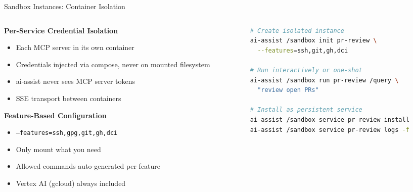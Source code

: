 \documentclass[aspectratio=169,10pt]{beamer}
\begin{document}
\begin{frame}[fragile]{Sandbox Instances: Container Isolation}
\begin{columns}[T]
\begin{column}{0.48\textwidth}
\textbf{\color{rhred}Per-Service Credential Isolation}
\begin{itemize}\scriptsize
  \item Each MCP server in its own container
  \item Credentials injected via compose, never on mounted filesystem
  \item ai-assist never sees MCP server tokens
  \item SSE transport between containers
\end{itemize}

\medskip
\textbf{\color{rhred}Feature-Based Configuration}
\begin{itemize}\scriptsize
  \item \texttt{--features=ssh,gpg,git,gh,dci}
  \item Only mount what you need
  \item Allowed commands auto-generated per feature
  \item Vertex AI (gcloud) always included
\end{itemize}
\end{column}
\begin{column}{0.48\textwidth}
\begin{lstlisting}[basicstyle=\ttfamily\fontsize{5}{6}\selectfont,frame=single,language=bash]
# Create isolated instance
ai-assist /sandbox init pr-review \
  --features=ssh,git,gh,dci

# Run interactively or one-shot
ai-assist /sandbox run pr-review /query \
  "review open PRs"

# Install as persistent service
ai-assist /sandbox service pr-review install
ai-assist /sandbox service pr-review logs -f
\end{lstlisting}

\smallskip
\centering
{}
\end{column}
\end{columns}
\end{frame}
\end{document}
